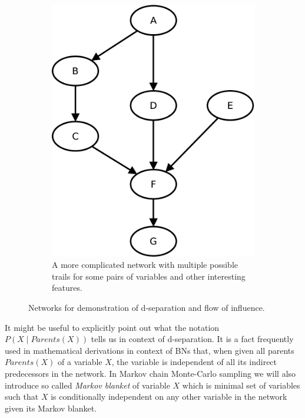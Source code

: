 \documentclass[english,cover]{fitthesis} %
\newcommand{\term}[1]{\emph{#1}}           %
\begin{document}
\begin{center}
\begin{figure}[h]
    \begin{subfigure}[b]{0.42\linewidth}
        \vspace{0.5cm}
        \includegraphics[scale=0.4]{fig/bn-d_sep-abstract}
        \caption{A more complicated network with multiple possible trails for some pairs of variables and other interesting features.}
        \label{fig:bn_d-separation_abstract}
    \end{subfigure}
    
    \caption{Networks for demonstration of d-separation and flow of influence.}
    \label{fig:bn_d-separation}
\end{figure}
\end{center}

It might be useful to explicitly point out what the notation $P(X \mid Parents(X))$ tells us in context of d-separation. It is a fact frequently used in mathematical derivations in context of BNs that, when given all parents $Parents(X)$ of a variable $X$, the variable is independent of all its indirect predecessors in the network. In Markov chain Monte-Carlo sampling we will also introduce so called \term{Markov blanket} of variable $X$ which is minimal set of variables such that $X$ is conditionally independent on any other variable in the network given its Markov blanket.
\end{document}
